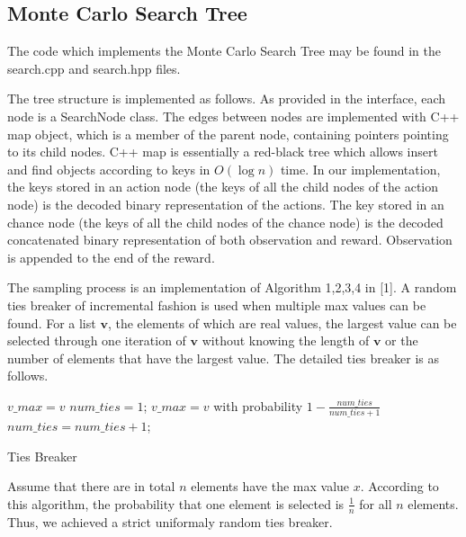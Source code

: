 \documentclass{article}
\let\Oldsubsection\subsection
\renewcommand{\subsection}{\FloatBarrier\Oldsubsection}
\begin{document}
\begin{flushleft}

\subsection{Monte Carlo Search Tree}

The code which implements the Monte Carlo Search Tree may be found in the search.cpp and search.hpp files. \newline

The tree structure is implemented as follows. 
As provided in the interface, each node is a SearchNode class. The edges between nodes are implemented with C++ map object, which is a member of the parent node, containing pointers pointing to its child nodes. C++ map is essentially a red-black tree which allows insert and find objects according to keys in $O(\log n)$ time. In our implementation, the keys stored in an action node (the keys of all the child nodes of the action node) is the decoded binary representation of the actions. The key stored in an chance node (the keys of all the child nodes of the chance node) is the decoded concatenated binary representation of both observation and reward. Observation is appended to the end of the reward.\newline

The sampling process is an implementation of Algorithm 1,2,3,4 in [1]. A random ties breaker of incremental fashion is used when multiple max values can be found. For a list $\mathbf{v}$, the elements of which are real values, the largest value can be selected through one iteration of $\mathbf{v}$ without knowing the length of $\mathbf{v}$ or the number of elements that have the largest value. The detailed ties breaker is as follows.

\begin{algorithm}[H]

 {
  {
   $v\_max = v$\;
   $num\_ties = 1$;
  }
  {
    $v\_max = v$ with probability $1 - \frac{num\_ties}{num\_ties + 1}$ \;
    $num\_ties = num\_ties + 1$;
  }
 }
 \caption{Ties Breaker}
\end{algorithm}

Assume that there are in total $n$ elements have the max value $x$.
According to this algorithm, the probability that one element is selected is $\frac{1}{n}$ for all $n$ elements. Thus, we achieved a strict uniformaly random ties breaker. \newline


\end{flushleft}
\end{document}
